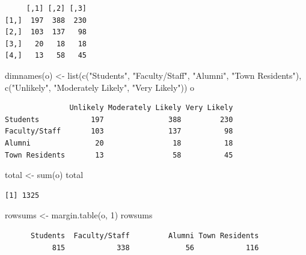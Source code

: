 \documentclass[
  letterpaper,
  DIV=11,
  numbers=noendperiod]{scrreprt}
\newenvironment{Shaded}{\begin{snugshade}}{\end{snugshade}}
\newcommand{\DecValTok}[1]{\textcolor[rgb]{0.68,0.00,0.00}{#1}}
\newcommand{\FunctionTok}[1]{\textcolor[rgb]{0.28,0.35,0.67}{#1}}
\newcommand{\NormalTok}[1]{\textcolor[rgb]{0.00,0.23,0.31}{#1}}
\newcommand{\OtherTok}[1]{\textcolor[rgb]{0.00,0.23,0.31}{#1}}
\newcommand{\StringTok}[1]{\textcolor[rgb]{0.13,0.47,0.30}{#1}}
\begin{document}
\begin{verbatim}
     [,1] [,2] [,3]
[1,]  197  388  230
[2,]  103  137   98
[3,]   20   18   18
[4,]   13   58   45
\end{verbatim}

\begin{Shaded}
\begin{Highlighting}[]
\FunctionTok{dimnames}\NormalTok{(o) }\OtherTok{\textless{}{-}} \FunctionTok{list}\NormalTok{(}\FunctionTok{c}\NormalTok{(}\StringTok{"Students"}\NormalTok{, }\StringTok{"Faculty/Staff"}\NormalTok{, }\StringTok{"Alumni"}\NormalTok{, }\StringTok{"Town Residents"}\NormalTok{),}
    \FunctionTok{c}\NormalTok{(}\StringTok{"Unlikely"}\NormalTok{, }\StringTok{"Moderately Likely"}\NormalTok{, }\StringTok{"Very Likely"}\NormalTok{))}
\NormalTok{o}
\end{Highlighting}
\end{Shaded}

\begin{verbatim}
               Unlikely Moderately Likely Very Likely
Students            197               388         230
Faculty/Staff       103               137          98
Alumni               20                18          18
Town Residents       13                58          45
\end{verbatim}

\begin{Shaded}
\begin{Highlighting}[]
\NormalTok{total }\OtherTok{\textless{}{-}} \FunctionTok{sum}\NormalTok{(o)}
\NormalTok{total}
\end{Highlighting}
\end{Shaded}

\begin{verbatim}
[1] 1325
\end{verbatim}

\begin{Shaded}
\begin{Highlighting}[]
\NormalTok{rowsums }\OtherTok{\textless{}{-}} \FunctionTok{margin.table}\NormalTok{(o, }\DecValTok{1}\NormalTok{)}
\NormalTok{rowsums}
\end{Highlighting}
\end{Shaded}

\begin{verbatim}
      Students  Faculty/Staff         Alumni Town Residents 
           815            338             56            116 
\end{verbatim}
\end{document}
